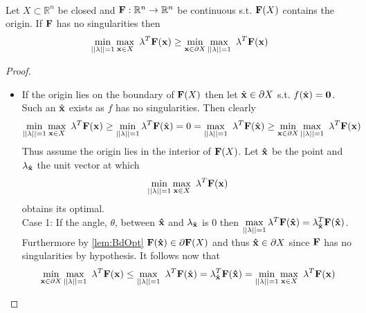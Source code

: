 \begin{thm} \ \\
\label{thm:MainIneq}
Let $X\subset\mathbb{R}^n$ be closed and $\bold{F}:\mathbb{R}^n\rightarrow\mathbb{R}^n$ be continuous s.t. $\bold{F}(X)$ contains the origin. 
If $\bold{F}$ has no singularities then $$\min\limits_{||\bold{\lambda}||=1}\max\limits_{\bold x\in X}\ \bold{\lambda}^T\bold{F}(\bold x)\geq \min\limits_{\bold x\in \partial X}\max\limits_{||\bold{\lambda}||=1}\ \bold{\lambda}^T\bold{F}(\bold x)$$
\begin{proof} \ \\
\begin{itemize}
\item[] If the origin lies on the boundary of $\bold{F}(X)$ then let $\hat{\bold x}\in \partial X$ s.t. $f(\hat{\bold x})=\textbf{0}$. 
Such an $\hat{\bold x}$ exists as $f$ has no singularities. 
Then  clearly $$\min\limits_{||\bold{\lambda}||=1}\max\limits_{\bold x\in X}\ \bold{\lambda}^T\bold{F}(\bold x)\geq \min\limits_{||\bold{\lambda}||=1}\bold{\lambda}^T\bold{F}(\hat{\bold x})= 0 = \max\limits_{||\bold{\lambda}||=1}\ \bold{\lambda}^T\bold{F}(\hat{\bold x}) \geq \min\limits_{\bold x\in \partial X}\max\limits_{||\bold{\lambda}||=1}\ \bold{\lambda}^T\bold{F}(\bold x)$$
Thus assume the origin lies in the interior of $\bold{F}(X)$.
Let $\bold{\hat{x}}$ be the point and $\bold{\lambda}_{\bold{\hat{x}}}$ the unit vector at which $$\min\limits_{||\bold{\lambda}||=1}\max\limits_{\bold x\in X}\ \bold{\lambda}^T\bold{F}(\bold x)$$
obtains its optimal. \\

Case 1: If the angle, $\theta$, between $\bold{\hat{x}}$ and $\bold{\lambda}_{\bold{\hat{x}}}$ is 0 then $\max\limits_{||\bold{\lambda}||=1}\bold{\lambda}^T\bold{F}(\bold{\hat{x}})=\bold{\lambda}_{\bold{\hat{x}}}^T\bold{F}(\bold{\hat{x}})$. 
Furthermore by \cref{lem:BdOpt} $\bold{F}(\bold{\hat{x}})\in \partial \bold{F}(X)$ and thus $\bold{\hat{x}}\in \partial X$ since $\bold{F}$ has no singularities by hypothesis. 
It follows now that $$\min\limits_{\bold x\in \partial X}\max\limits_{||\bold{\lambda}||=1}\ \bold{\lambda}^T\bold{F}(\bold x)\leq \max\limits_{||\bold{\lambda}||=1}\ \bold{\lambda}^T\bold{F}(\hat{\bold x})=\bold{\lambda}_{\bold{\hat{x}}}^T\bold{F}(\bold{\hat{x}})=\min\limits_{||\bold{\lambda}||=1}\max\limits_{\bold x\in X}\ \bold{\lambda}^T\bold{F}(\bold x)$$


\end{itemize}
\end{proof}
\end{thm}
